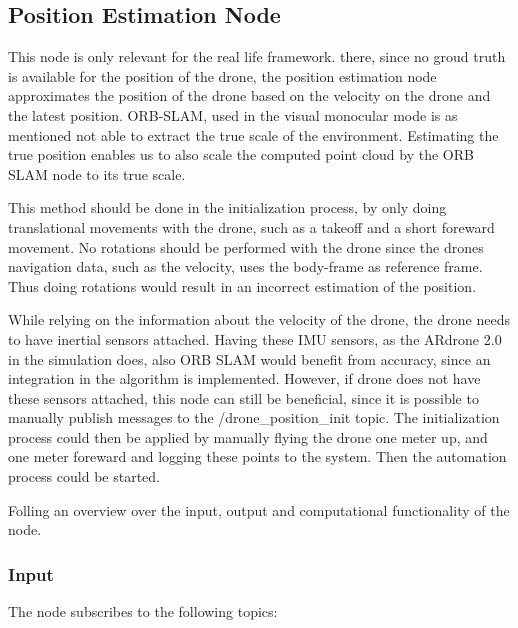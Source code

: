 	
	\subsection{Position Estimation Node}
	
	This node is only relevant for the real life framework. there, since no groud truth is available for the position of the drone, 
	the position estimation node approximates the position of the drone based on the velocity on the drone and the latest position. ORB-SLAM, used 
	in the visual monocular mode is as mentioned not able to extract the true scale of the environment. Estimating the true position enables us 
	to also scale the computed point cloud by the ORB SLAM node to its true scale. 
	
	This method should be done in the initialization process, by 
	only doing translational movements with the drone, such as a takeoff and a short foreward movement. No rotations should be performed with the drone 
	since the drones navigation data, such as the velocity, uses the body-frame as reference frame. Thus doing rotations would result in an incorrect 
	estimation of the position. 
	
	While relying on the information about the 
	velocity of the drone, the drone needs to have inertial sensors attached. Having these IMU sensors, as the ARdrone 2.0 in the simulation does,
	also ORB SLAM would benefit from 
	accuracy, since an integration in the algorithm is implemented. However, if drone does not have these sensors attached, 
	this node can still be beneficial, since it is possible to manually publish messages to the /drone\_position\_init topic. 
	The initialization process could then be applied 
	by manually flying the drone one meter up, and one meter foreward and logging these points to the system. Then the automation process could be started.
	
	
	Folling an overview over the input, output and computational functionality of the node. 
	
	\subsubsection{Input}
	
	The node subscribes to the following topics:
	
